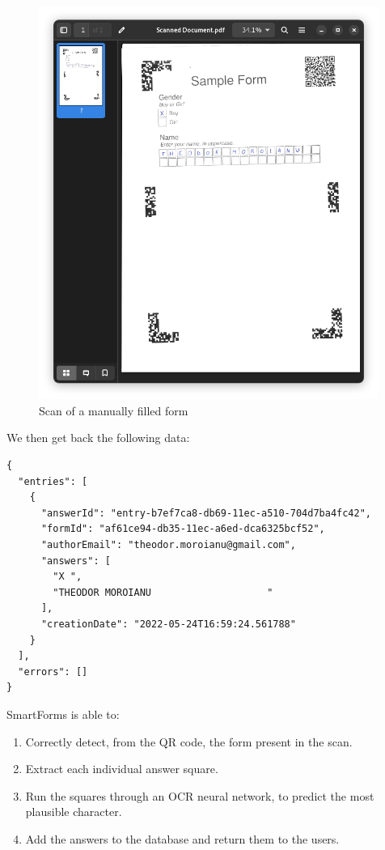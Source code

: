 \documentclass[11pt, a4paper]{report}
\begin{document}
\begin{figure}[!h]
    \centering
    \includegraphics[width=30em]{images/screenshoots/sample_form_scan.png}
    \caption{Scan of a manually filled form}
    \label{fig:label}
\end{figure}


We then get back the following data:

\begin{verbatim}
{
  "entries": [
    {
      "answerId": "entry-b7ef7ca8-db69-11ec-a510-704d7ba4fc42",
      "formId": "af61ce94-db35-11ec-a6ed-dca6325bcf52",
      "authorEmail": "theodor.moroianu@gmail.com",
      "answers": [
        "X ",
        "THEODOR MOROIANU                    "
      ],
      "creationDate": "2022-05-24T16:59:24.561788"
    }
  ],
  "errors": []
}
\end{verbatim}

SmartForms is able to:
\begin{enumerate}
    \item Correctly detect, from the QR code, the form present in the scan.
    \item Extract each individual answer square.
    \item Run the squares through an OCR neural network, to predict the most plausible character.
    \item Add the answers to the database and return them to the users.
\end{enumerate}
\end{document}
